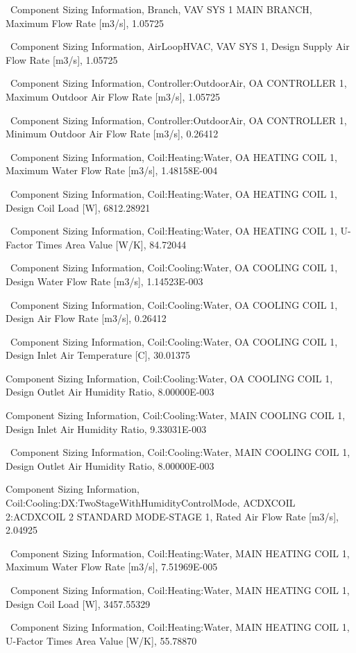 ~Component Sizing Information, Branch, VAV SYS 1 MAIN BRANCH, Maximum Flow Rate {[}m3/s{]}, 1.05725

~Component Sizing Information, AirLoopHVAC, VAV SYS 1, Design Supply Air Flow Rate {[}m3/s{]}, 1.05725

~Component Sizing Information, Controller:OutdoorAir, OA CONTROLLER 1, Maximum Outdoor Air Flow Rate {[}m3/s{]}, 1.05725

~Component Sizing Information, Controller:OutdoorAir, OA CONTROLLER 1, Minimum Outdoor Air Flow Rate {[}m3/s{]}, 0.26412

~Component Sizing Information, Coil:Heating:Water, OA HEATING COIL 1, Maximum Water Flow Rate {[}m3/s{]}, 1.48158E-004

~Component Sizing Information, Coil:Heating:Water, OA HEATING COIL 1, Design Coil Load {[}W{]}, 6812.28921

~Component Sizing Information, Coil:Heating:Water, OA HEATING COIL 1, U-Factor Times Area Value {[}W/K{]}, 84.72044

~Component Sizing Information, Coil:Cooling:Water, OA COOLING COIL 1, Design Water Flow Rate {[}m3/s{]}, 1.14523E-003

~Component Sizing Information, Coil:Cooling:Water, OA COOLING COIL 1, Design Air Flow Rate {[}m3/s{]}, 0.26412

~Component Sizing Information, Coil:Cooling:Water, OA COOLING COIL 1, Design Inlet Air Temperature {[}C{]}, 30.01375

Component Sizing Information, Coil:Cooling:Water, OA COOLING COIL 1, Design Outlet Air Humidity Ratio, 8.00000E-003

Component Sizing Information, Coil:Cooling:Water, MAIN COOLING COIL 1, Design Inlet Air Humidity Ratio, 9.33031E-003

~Component Sizing Information, Coil:Cooling:Water, MAIN COOLING COIL 1, Design Outlet Air Humidity Ratio, 8.00000E-003

Component Sizing Information, Coil:Cooling:DX:TwoStageWithHumidityControlMode, ACDXCOIL 2:ACDXCOIL 2 STANDARD MODE-STAGE 1, Rated Air Flow Rate {[}m3/s{]}, 2.04925

~Component Sizing Information, Coil:Heating:Water, MAIN HEATING COIL 1, Maximum Water Flow Rate {[}m3/s{]}, 7.51969E-005

~Component Sizing Information, Coil:Heating:Water, MAIN HEATING COIL 1, Design Coil Load {[}W{]}, 3457.55329

~Component Sizing Information, Coil:Heating:Water, MAIN HEATING COIL 1, U-Factor Times Area Value {[}W/K{]}, 55.78870

